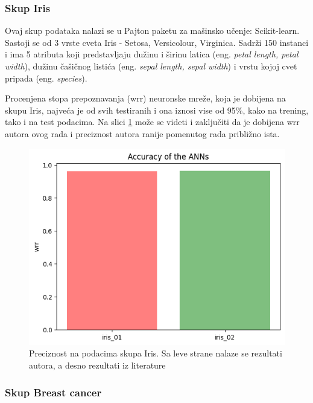 \documentclass[a4paper]{article}
\begin{document}
\subsubsection{Skup Iris}
\label{iris}

Ovaj skup podataka nalazi se u Pajton paketu za mašinsko učenje: Scikit-learn. Sastoji se od 3 vrste cveta Iris - Setosa, Versicolour, Virginica.
Sadrži 150 instanci i ima 5 atributa koji predstavljaju dužinu i širinu latica (eng. \emph{petal length, petal width}), dužinu čašičnog listića 
(eng. \emph{sepal length, sepal width}) i vrstu kojoj cvet pripada (eng. \emph{species}). 

Procenjena stopa prepoznavanja (wrr) neuronske mreže, koja je dobijena na skupu Iris, najveća je od svih testiranih i ona iznosi vise od 95\%, 
kako na trening, tako i na test podacima. Na slici \ref{fig:irisslika} može se videti i zaključiti da je dobijena wrr autora ovog rada i preciznost 
autora ranije pomenutog rada \cite{hindawi} približno ista.

\begin{figure}[h!]
\centering
\captionsetup{justification=centering,margin=2cm}
\begin{center}
\includegraphics[scale=0.4]{img/iriswrr.png}
\end{center}
\caption{Preciznost na podacima skupa Iris. Sa leve strane nalaze se rezultati autora, a desno rezultati iz literature \cite{hindawi} }
\label{fig:irisslika}
\end{figure}

\subsubsection{Skup Breast cancer}
\label{breast}
\end{document}
